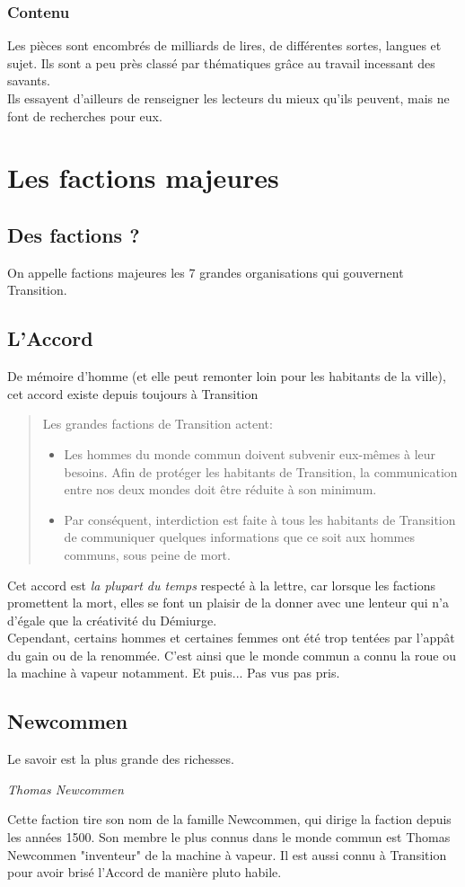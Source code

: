 \documentclass{book}
\begin{document}
\subsection{Contenu}
Les pièces sont encombrés de milliards de lires, de différentes sortes, langues et sujet. Ils sont a peu près classé par thématiques grâce au travail incessant des savants.\\
Ils essayent d'ailleurs de renseigner les lecteurs du mieux qu'ils peuvent, mais ne font de recherches pour eux.


\chapter{Les factions majeures}
\section{Des factions ?}
On appelle factions majeures les 7 grandes organisations qui gouvernent Transition.
\hypertarget{accord}{\section{L'Accord}}
De mémoire d'homme (et elle peut remonter loin pour les habitants de la ville), cet accord existe depuis toujours à Transition
\begin{quote}
	Les grandes factions de Transition actent:
	\begin{itemize}
		\item Les hommes du monde commun doivent subvenir eux-mêmes à leur besoins. Afin de protéger les habitants de Transition, la communication entre nos deux mondes doit être réduite à son minimum.
		\item Par conséquent, interdiction est faite à tous les habitants de Transition de communiquer quelques informations que ce soit aux hommes communs, sous peine de mort.
	\end{itemize}
\end{quote}
Cet accord est \emph{la plupart du temps} respecté à la lettre, car lorsque les factions promettent la mort, elles se font un plaisir de la donner avec une lenteur qui n'a d'égale que la créativité du Démiurge.
\\
Cependant, certains hommes et certaines femmes ont été trop tentées par l'appât du gain ou de la renommée. C'est ainsi que le monde commun a connu la roue ou la machine à vapeur notamment. Et puis... Pas vus pas pris.

\section{Newcommen}
\epigraph{Le savoir est la plus grande des richesses.}{\textit{Thomas Newcommen}}
Cette faction tire son nom de la famille Newcommen, qui dirige la faction depuis les années 1500. Son membre le plus connus dans le monde commun est Thomas Newcommen "inventeur" de la machine à vapeur. Il est aussi connu à Transition pour avoir brisé l'Accord de manière pluto habile.
\end{document}
